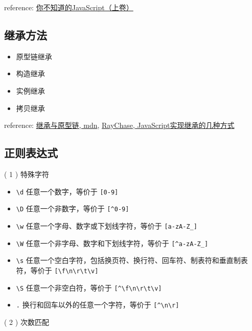 reference: \href{http://book.douban.com/subject/26351021/}{你不知道的JavaScript（上卷）}

\subsection{继承方法}\hypertarget{section-6}{}\label{section-6}

\begin{itemize}
\item 原型链继承
\item 构造继承
\item 实例继承
\item 拷贝继承
\end{itemize}

reference: \href{https://developer.mozilla.org/zh-CN/docs/Web/JavaScript/Inheritance\_and\_the\_prototype\_chain}{继承与原型链, mdn}, \href{http://raychase.iteye.com/blog/1337415}{RayChase, JavaScript实现继承的几种方式}

\subsection{正则表达式}\hypertarget{section-7}{}\label{section-7}

( 1 ) 特殊字符

\begin{itemize}
\item \texttt{\textbackslash{}d} 任意一个数字，等价于 \texttt{[0-9]}
\item \texttt{\textbackslash{}D} 任意一个非数字，等价于 \texttt{[\^{}0-9]}
\item \texttt{\textbackslash{}w} 任意一个字母、数字或下划线字符，等价于 \texttt{[a-zA-Z\_]}
\item \texttt{\textbackslash{}W} 任意一个非字母、数字和下划线字符，等价于 \texttt{[\^{}a-zA-Z\_]}
\item \texttt{\textbackslash{}s} 任意一个空白字符，包括换页符、换行符、回车符、制表符和垂直制表符，等价于 \texttt{[\textbackslash{}f\textbackslash{}n\textbackslash{}r\textbackslash{}t\textbackslash{}v]}
\item \texttt{\textbackslash{}S} 任意一个非空白符，等价于 \texttt{[\^{}\textbackslash{}f\textbackslash{}n\textbackslash{}r\textbackslash{}t\textbackslash{}v]}
\item \texttt{.} 换行和回车以外的任意一个字符，等价于 \texttt{[\^{}\textbackslash{}n\textbackslash{}r]}
\end{itemize}

( 2 ) 次数匹配

